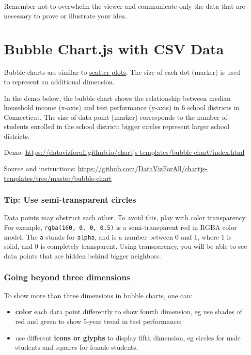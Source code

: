 \documentclass[
  english,
]{book}
\providecommand{\tightlist}{%
  \setlength{\itemsep}{0pt}\setlength{\parskip}{0pt}}
\begin{document}
Remember not to overwhelm the viewer and communicate only the data that are necessary to prove or illustrate your idea.

\hypertarget{chartjs-bubble}{%
\section{Bubble Chart.js with CSV Data}\label{chartjs-bubble}}

Bubble charts are similar to \href{scatter-chart-with-csv-data}{scatter plots}. The size of each dot (marker) is used to represent an additional dimension.

In the demo below, the bubble chart shows the relationship between median household income (x-axis) and test performance (y-axis) in 6 school districts in Connecticut. The size of data point (marker) corresponds to the number of students enrolled in the school district: bigger circles represent larger school districts.

Demo: \url{https://datavizforall.github.io/chartjs-templates/bubble-chart/index.html}

Source and instructions: \url{https://github.com/DataVizForAll/chartjs-templates/tree/master/bubble-chart}

\hypertarget{tip-use-semi-transparent-circles}{%
\subsubsection{Tip: Use semi-transparent circles}\label{tip-use-semi-transparent-circles}}

Data points may obstruct each other. To avoid this, play with color transparency. For example, \texttt{rgba(160,\ 0,\ 0,\ 0.5)} is a semi-transparent red in RGBA color model. The \texttt{a} stands for \texttt{alpha}, and is a number between 0 and 1, where 1 is solid, and 0 is completely transparent. Using transparency, you will be able to see data points that are hidden behind bigger neighbors.

\hypertarget{going-beyond-three-dimensions}{%
\subsubsection{Going beyond three dimensions}\label{going-beyond-three-dimensions}}

To show more than three dimensions in bubble charts, one can:

\begin{itemize}
\tightlist
\item
  \textbf{color} each data point differently to show fourth dimension, eg use shades of red and green to show 5-year trend in test performance;
\item
  use different \textbf{icons or glyphs} to display fifth dimension, eg circles for male students and squares for female students.
\end{itemize}
\end{document}
